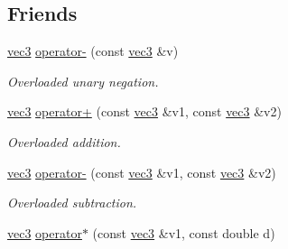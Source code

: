 \subsection*{\-Friends}
\begin{DoxyCompactItemize}
\item 
\hypertarget{classutil_1_1math_1_1vec3_ad57f6a85dd0416a336c6d6bbbfdf5441}{\hyperlink{classutil_1_1math_1_1vec3}{vec3} \hyperlink{classutil_1_1math_1_1vec3_ad57f6a85dd0416a336c6d6bbbfdf5441}{operator-\/} (const \hyperlink{classutil_1_1math_1_1vec3}{vec3} \&v)}\label{classutil_1_1math_1_1vec3_ad57f6a85dd0416a336c6d6bbbfdf5441}

\begin{DoxyCompactList}\small\item\em \-Overloaded unary negation. \end{DoxyCompactList}\item 
\hypertarget{classutil_1_1math_1_1vec3_acf5352581471d83c7a24e8def644c5f0}{\hyperlink{classutil_1_1math_1_1vec3}{vec3} \hyperlink{classutil_1_1math_1_1vec3_acf5352581471d83c7a24e8def644c5f0}{operator+} (const \hyperlink{classutil_1_1math_1_1vec3}{vec3} \&v1, const \hyperlink{classutil_1_1math_1_1vec3}{vec3} \&v2)}\label{classutil_1_1math_1_1vec3_acf5352581471d83c7a24e8def644c5f0}

\begin{DoxyCompactList}\small\item\em \-Overloaded addition. \end{DoxyCompactList}\item 
\hypertarget{classutil_1_1math_1_1vec3_a53bb1e0d21f6bd657bec6a332928e658}{\hyperlink{classutil_1_1math_1_1vec3}{vec3} \hyperlink{classutil_1_1math_1_1vec3_a53bb1e0d21f6bd657bec6a332928e658}{operator-\/} (const \hyperlink{classutil_1_1math_1_1vec3}{vec3} \&v1, const \hyperlink{classutil_1_1math_1_1vec3}{vec3} \&v2)}\label{classutil_1_1math_1_1vec3_a53bb1e0d21f6bd657bec6a332928e658}

\begin{DoxyCompactList}\small\item\em \-Overloaded subtraction. \end{DoxyCompactList}\item 
\hypertarget{classutil_1_1math_1_1vec3_a468e40be151ef1a0e4dd735ee43f9205}{\hyperlink{classutil_1_1math_1_1vec3}{vec3} \hyperlink{classutil_1_1math_1_1vec3_a468e40be151ef1a0e4dd735ee43f9205}{operator$\ast$} (const \hyperlink{classutil_1_1math_1_1vec3}{vec3} \&v1, const double d)}\label{classutil_1_1math_1_1vec3_a468e40be151ef1a0e4dd735ee43f9205}


\end{DoxyCompactItemize}
